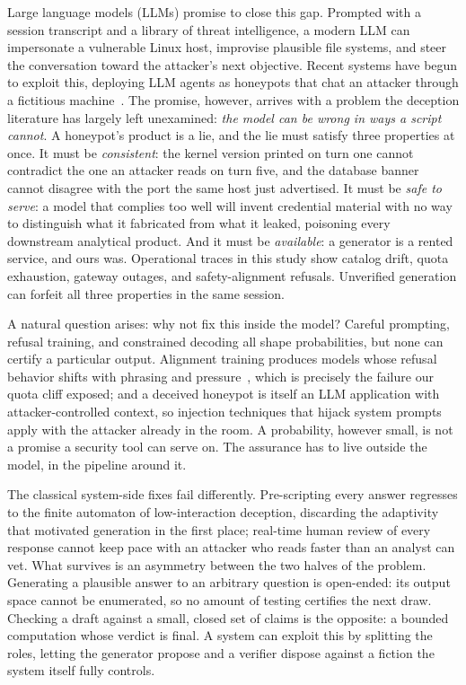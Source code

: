 Large language models (LLMs) promise to close this gap. Prompted with a
session transcript and a library of threat intelligence, a modern LLM can
impersonate a vulnerable Linux host, improvise plausible file systems, and
steer the conversation toward the attacker's next objective. Recent systems
have begun to exploit this, deploying LLM agents as honeypots that chat an
attacker through a fictitious machine~\cite{reworr2024}. The promise,
however, arrives with a problem the deception literature has largely left
unexamined: \emph{the model can be wrong in ways a script cannot}. A
honeypot's product is a lie, and the lie must satisfy three properties at
once. It must be \emph{consistent}: the kernel version printed on turn one
cannot contradict the one an attacker reads on turn five, and the database
banner cannot disagree with the port the same host just advertised. It
must be \emph{safe to serve}: a model that complies too well will invent
credential material with no way to distinguish what it fabricated from
what it leaked, poisoning every downstream analytical product. And it
must be \emph{available}: a generator is a rented service, and ours was.
Operational traces in this study show catalog drift, quota exhaustion,
gateway outages, and safety-alignment refusals. Unverified generation can
forfeit all three properties in the same session.

A natural question arises: why not fix this inside the model? Careful
prompting, refusal training, and constrained decoding all shape
probabilities, but none can certify a particular output. Alignment
training produces models whose refusal behavior shifts with phrasing and
pressure~\cite{ganguli2022,bai2022}, which is precisely the failure our
quota cliff exposed; and a deceived honeypot is itself an LLM application
with attacker-controlled context, so injection techniques that hijack
system prompts~\cite{greshake2023} apply with the attacker already in the
room. A probability, however small, is not a promise a security tool
can serve on. The assurance has to live outside the model, in the
pipeline around it.

The classical system-side fixes fail differently. Pre-scripting every
answer regresses to the finite automaton of low-interaction deception,
discarding the adaptivity that motivated generation in the first place;
real-time human review of every response cannot keep pace with an
attacker who reads faster than an analyst can vet. What survives is an
asymmetry between the two halves of the problem. Generating a plausible
answer to an arbitrary question is open-ended: its output space cannot
be enumerated, so no amount of testing certifies the next draw.
Checking a draft against a small, closed set of claims is the opposite:
a bounded computation whose verdict is final. A system can exploit this
by splitting the roles, letting the generator propose and a verifier
dispose against a fiction the system itself fully controls.

